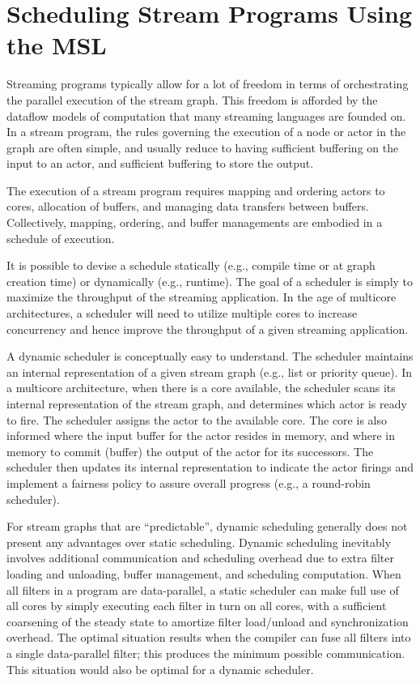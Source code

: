 \section{Scheduling Stream Programs Using the MSL}\label{ch:ds}

Streaming programs typically allow for a lot of freedom in terms of
orchestrating the parallel execution of the stream graph. This freedom is
afforded by the dataflow models of computation that many streaming
languages are founded on. In a stream program, the rules governing the
execution of a node or actor in the graph are often simple, and usually
reduce to having sufficient buffering on the input to an actor, and
sufficient buffering to store the output.

The execution of a stream program requires mapping and ordering actors
to cores, allocation of buffers, and managing data transfers between
buffers. Collectively, mapping, ordering, and buffer managements are
embodied in a schedule of execution.

It is possible to devise a schedule statically (e.g., compile time or
at graph creation time) or dynamically (e.g., runtime). The goal of a
scheduler is simply to maximize the throughput of the streaming
application. In the age of multicore architectures, a scheduler will
need to utilize multiple cores to increase concurrency and hence improve
the throughput of a given streaming application. 

A dynamic scheduler is conceptually easy to understand. The scheduler
maintains an internal representation of a given stream graph (e.g.,
list or priority queue). In a multicore architecture, when there is a
core available, the scheduler scans its internal representation of the
stream graph, and determines which actor is ready to fire.
The scheduler assigns the actor to the available core. The core is
also informed where the input buffer for the actor resides in memory,
and where in memory to commit (buffer) the output of the actor for its
successors. The scheduler then updates its internal representation to
indicate the actor firings and implement a fairness policy to assure
overall progress (e.g., a round-robin scheduler).

For stream graphs that are ``predictable'', dynamic scheduling
generally does not present any advantages over static
scheduling. Dynamic scheduling inevitably involves additional
communication and scheduling overhead due to extra filter loading and
unloading, buffer management, and scheduling computation. When all
filters in a program are data-parallel, a static scheduler can make
full use of all cores by simply executing each filter in turn on all
cores, with a sufficient coarsening of the steady state to amortize
filter load/unload and synchronization overhead. The optimal
situation results when the compiler can fuse all filters into a single
data-parallel filter; this produces the minimum possible communication.
This situation would also be optimal for a dynamic scheduler.

